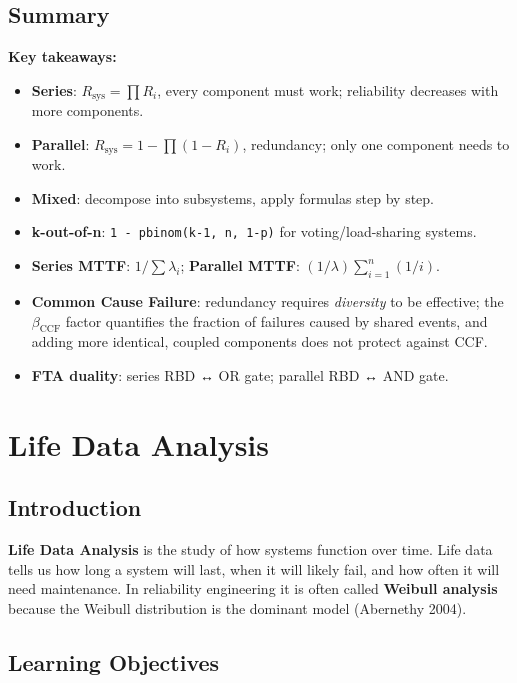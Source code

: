 \documentclass[
  letterpaper,
  DIV=11,
  numbers=noendperiod]{scrreprt}
\providecommand{\tightlist}{%
  \setlength{\itemsep}{0pt}\setlength{\parskip}{0pt}}
\begin{document}
\section{Summary}\label{summary-1}

\textbf{Key takeaways:}

\begin{itemize}
\tightlist
\item
  \textbf{Series}: \(R_{\text{sys}} = \prod R_i\), every component must
  work; reliability decreases with more components.
\item
  \textbf{Parallel}: \(R_{\text{sys}} = 1 - \prod(1-R_i)\), redundancy;
  only one component needs to work.
\item
  \textbf{Mixed}: decompose into subsystems, apply formulas step by
  step.
\item
  \textbf{k-out-of-n}: \texttt{1\ -\ pbinom(k-1,\ n,\ 1-p)} for
  voting/load-sharing systems.
\item
  \textbf{Series MTTF}: \(1/\sum\lambda_i\); \textbf{Parallel MTTF}:
  \((1/\lambda)\sum_{i=1}^{n}(1/i)\).
\item
  \textbf{Common Cause Failure}: redundancy requires \emph{diversity} to
  be effective; the \(\beta_{\text{CCF}}\) factor quantifies the
  fraction of failures caused by shared events, and adding more
  identical, coupled components does not protect against CCF.
\item
  \textbf{FTA duality}: series RBD ↔ OR gate; parallel RBD ↔ AND gate.
\end{itemize}


\chapter{Life Data Analysis}\label{sec-lda}

\section{Introduction}\label{introduction-2}

\textbf{Life Data Analysis} is the study of how systems function over
time. Life data tells us how long a system will last, when it will
likely fail, and how often it will need maintenance. In reliability
engineering it is often called \textbf{Weibull analysis} because the
Weibull distribution is the dominant model (Abernethy 2004).

\section{Learning Objectives}\label{learning-objectives-2}
\end{document}
